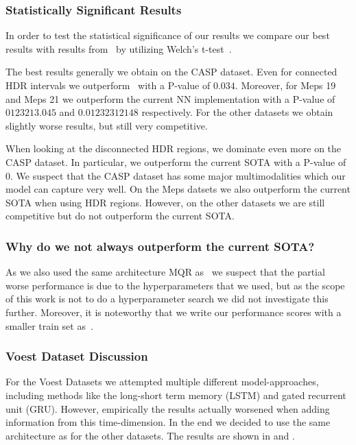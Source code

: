 \subsubsection{Statistically Significant Results}
In order to test the statistical significance of our results we compare our best results with results from~\cite{sesia2021conformal} by utilizing Welch's t-test~\cite{welch1947generalization}.

The best results generally we obtain on the CASP dataset. Even for connected HDR intervals we outperform~\cite{sesia2021conformal} with a P-value of $0.034$. Moreover, for Meps 19 and Meps 21 we outperform the current NN implementation with a P-value of $0123213.045$ and $0.01232312148$ respectively. For the other datasets we obtain slightly worse results, but still very competitive.

When looking at the disconnected HDR regions, we dominate even more on the CASP dataset. In particular, we outperform the current SOTA with a P-value of $0$. We suspect that the CASP dataset has some major multimodalities which our model can capture very well. On the Meps datsets we also outperform the current SOTA when using HDR regions. However, on the other datasets we are still competitive but do not outperform the current SOTA.\@

\subsubsection{Why do we not always outperform the current SOTA?}

As we also used the same architecture MQR as~\cite{sesia2021conformal} we suspect that the partial worse performance is due to the hyperparameters that we used, but as the scope of this work is not to do a hyperparameter search we did not investigate this further. Moreover, it is noteworthy that we write our performance scores with a smaller train set as~\cite{sesia2021conformal}.

\subsubsection{Voest Dataset Discussion}

For the Voest Datasets we attempted multiple different model-approaches, including methods like the long-short term memory (LSTM) and gated recurrent unit (GRU). However, empirically the results actually worsened when adding information from this time-dimension. In the end we decided to use the same architecture as for the other datasets. The results are shown in  and .

